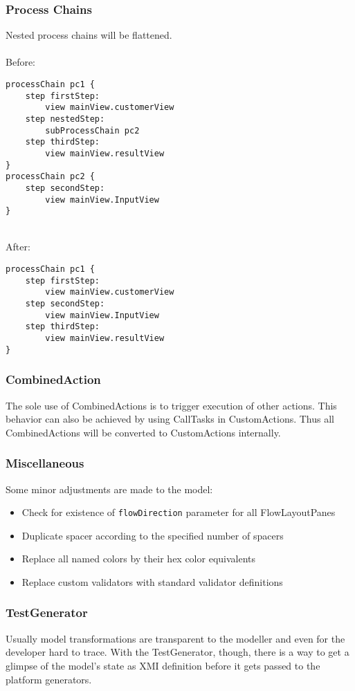\subsubsection{Process Chains}
Nested process chains will be flattened. \\ \\
Before:
\begin{lstlisting}[language=MD2]
processChain pc1 {
	step firstStep:
		view mainView.customerView
	step nestedStep:
		subProcessChain pc2
	step thirdStep:
		view mainView.resultView
}
processChain pc2 {
	step secondStep:
		view mainView.InputView
}
\end{lstlisting}
~
\\
After:
\begin{lstlisting}[language=MD2]
processChain pc1 {
	step firstStep:
		view mainView.customerView
	step secondStep:
		view mainView.InputView
	step thirdStep:
		view mainView.resultView
}

\end{lstlisting}

\subsubsection{CombinedAction}
The sole use of CombinedActions is to trigger execution of other actions. This behavior can also be achieved by using CallTasks in CustomActions. Thus all CombinedActions will be converted to CustomActions internally.

\subsubsection{Miscellaneous}
Some minor adjustments are made to the model:

\begin{itemize}
\item Check for existence of \lstinline!flowDirection! parameter for all FlowLayoutPanes
\item Duplicate spacer according to the specified number of spacers
\item Replace all named colors by their hex color equivalents
\item Replace custom validators with standard validator definitions
\end{itemize}

\subsubsection{TestGenerator}
Usually model transformations are transparent to the modeller and even for the developer hard to trace. With the TestGenerator, though, there is a way to get a glimpse of the model’s state as XMI definition before it gets passed to the platform generators.